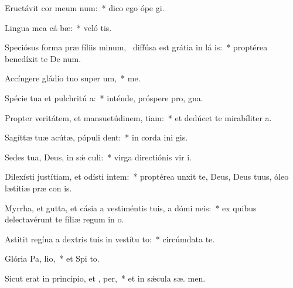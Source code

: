 \item Eructávit cor meum  num:~* dico ego ópe  gi.
\item Lingua mea cá bæ:~* veló tis.
\item Speciósus forma præ fíliis minum,~\pscross{} diffúsa est grátia in lá is:~* proptérea benedíxit te De  num.
\item Accíngere gládio tuo super  um,~* me.
\item Spécie tua et pulchritú a:~* inténde, próspere pro,  gna.
\item Propter veritátem, et mansuetúdinem,  tiam:~* et dedúcet te mirabíliter  a.
\item Sagíttæ tuæ acútæ, pópuli   dent:~* in corda ini gis.
\item Sedes tua, Deus, in sǽ culi:~* virga directiónis vir  i.
\item Dilexísti justítiam, et odísti intem:~* proptérea unxit te, Deus, Deus tuus, óleo lætítiæ præ con is.
\item Myrrha, et gutta, et cásia a vestiméntis tuis, a dómi neis:~* ex quibus delectavérunt te fíliæ regum in  o.
\item Astitit regína a dextris tuis in vestítu to:~* circúmdata te.
\item Glória Pa,  lio,~* et Spi to.
\item Sicut erat in princípio, et ,  per,~* et in sǽcula sæ. men.
